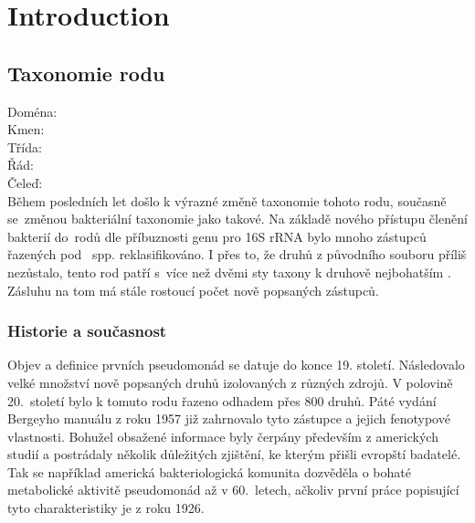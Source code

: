 \renewcommand{\chaptername}{Introduction}
\chapter*{Introduction}
\setcounter{page}{1}


\shorthandoff{-} 

\section{Taxonomie rodu }
               Doména:	\hspace{0,5cm} \\%
\hspace*{1,5cm} Kmen:	  \hspace{0,5cm} \\%
\hspace*{2,5cm} Třída:   \hspace{0,5cm} \\%
\hspace*{3,5cm} Řád:     \hspace{0,5cm} \\%
\hspace*{4,5cm} Čeleď:   \hspace{0,5cm} \\%

Během posledních let došlo k výrazné změně taxonomie tohoto rodu, současně se~změnou bakteriální taxonomie jako takové.
Na základě nového přístupu členění bakterií do~rodů dle příbuznosti genu pro 16S rRNA bylo mnoho zástupců řazených pod ~spp. reklasifikováno.
I přes to, že druhů z původního souboru příliš nezůstalo, tento rod patří s~více než dvěmi sty taxony k druhově nejbohatším \cite{www.bacterio.net}.
Zásluhu na tom má stále rostoucí počet nově popsaných zástupců. \cite{cornelis2008pseudomonas}

\subsection{Historie a současnost}
Objev a definice prvních pseudomonád se datuje do konce 19. století.
Následovalo velké množství nově popsaných druhů izolovaných z různých zdrojů.
V polovině 20.~století bylo k tomuto rodu řazeno odhadem přes 800 druhů. \cite{palleroni2010pseudomonas}
Páté vydání Bergeyho manuálu z roku 1957 již zahrnovalo tyto zástupce a jejich fenotypové vlastnosti.
Bohužel obsažené informace byly čerpány především z amerických studií a postrádaly několik důležitých zjištění, ke kterým přišli evropští badatelé.
Tak se například americká bakteriologická komunita dozvěděla o bohaté metabolické aktivitě pseudomonád až v 60.~letech, ačkoliv první práce popisující tyto charakteristiky je z roku 1926. \cite{palleroni2010pseudomonas}

